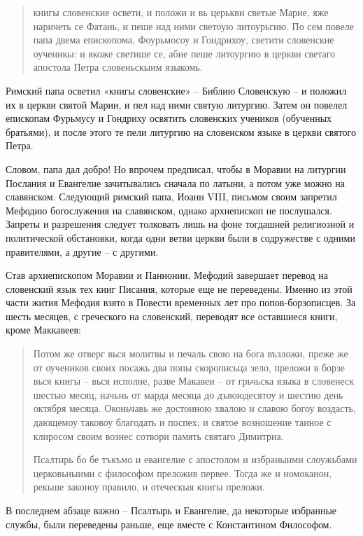 \begin{quotation}
книгы словенские освети, и положи и вь церькви светые Марие, яже наричеть се Фатань, и пеше над ними светоую литоурьгию. По сем повеле папа двема епископома, Фоурьмосоу и Гондрихоу, светити словенские оученикы: и якоже светише се, абие пеше литоургию в церкви светаго апостола Петра словеньскыим языкомь.
\end{quotation}

Римский папа осветил «книгы словенские» –  Библию Словенскую – и положил их в церкви святой Марии, и пел над ними святую литургию. Затем он повелел епископам Фурьмусу и Гондриху освятить словенских учеников (обученных братьями), и после этого те пели литургию на словенском языке в церкви святого Петра.

Словом, папа дал добро! Но впрочем предписал, чтобы в Моравии на литургии Послания и Евангелие зачитывались сначала по латыни, а потом уже можно на славянском. Следующий римский папа, Иоанн VIII, письмом своим запретил Мефодию богослужения на славянском, однако архиепископ не послушался. Запреты и разрешения следует толковать лишь на фоне тогдашней религиозной и политической обстановки, когда одни ветви церкви были в содружестве с одними правителями, а другие – с другими.

Став архиепископом Моравии и Паннонии, Мефодий завершает перевод на словенский язык тех книг Писания, которые еще не переведены. Именно из этой части жития Мефодия взято в Повести временных лет про попов-борзописцев. За шесть месяцев, с греческого на словенский, переводят все оставшиеся книги, кроме Маккавеев: 

\begin{quotation}
Потом же отверг вься молитвы и печаль свою на бога възложи, преже же от оучеников своих посажь два попы скорописьца зело, преложи в борзе вься книгы – вься исполне, разве Макавеи – от грьчьска языка в словенеск шестью месяц, начьнь от марда месяца до дъвоюдесятоу и шестию день октября месяца. Оконьчавь же достоиною хвалою и славою богоу воздасть, дающемоу таковоу благодать и поспех; и святое возношение таиное с клиросом своим вознес сотвори память святаго Димитриа.

Псалтирь бо бе тъкъмо и евангелие с апостолом и избраныими слоужьбами церковьныими с философом преложив первее. Тогда же и номоканон, рекьше законоу правило, и отеческыя книгы преложи.
\end{quotation}

В последнем абзаце важно – Псалтырь и Евангелие, да некоторые избранные службы, были переведены раньше, еще вместе с Константином Философом. 

